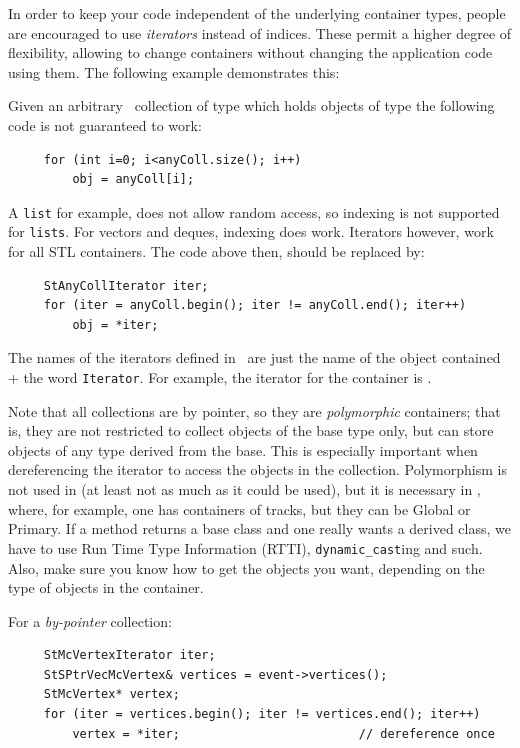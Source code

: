 In order to keep your code independent of the underlying container
types, people are encouraged to use \textit{iterators} instead of
indices. These permit a higher degree of flexibility,
allowing to change containers
without changing the application code using them. The following
example demonstrates this:

Given an arbitrary \StMcEvent\ collection  of type
which holds objects of type  the following code is
not guaranteed to work:
\begin{verbatim}
     for (int i=0; i<anyColl.size(); i++)
         obj = anyColl[i];
\end{verbatim}
A {\tt list} for example, does not allow random access, so indexing
is not supported for {\tt lists}.  For vectors and deques, indexing does work.
Iterators however, work for all STL containers.  The code above then,
should be replaced by:
\begin{verbatim}
     StAnyCollIterator iter;
     for (iter = anyColl.begin(); iter != anyColl.end(); iter++)
         obj = *iter;
\end{verbatim}

The names of the iterators defined in \StMcEvent\ are just the name
of the object contained + the word {\tt Iterator}.  For example,
the iterator for the container  is
.

Note that all collections are by pointer, so they are
\textit{polymorphic} containers; that is, they are not restricted to
collect objects of the base type only, but can store
objects of any type derived from
the base. This is especially important when dereferencing the iterator to
access the objects in the collection.  Polymorphism is
not used in \StMcEvent (at least not as much as it could be used), but
it is necessary in \StEvent, where,
for example, one has containers of tracks, but they can be Global
or Primary.  If a method returns a base class and one really wants
a derived class, we have to use Run Time Type Information (RTTI),
{\tt dynamic\_cast}ing and such.  Also, make sure you know how to
get the objects you want, depending on the type of objects in the
container.

For a \textit{by-pointer} collection:
\begin{verbatim}
     StMcVertexIterator iter;
     StSPtrVecMcVertex& vertices = event->vertices();
     StMcVertex* vertex;
     for (iter = vertices.begin(); iter != vertices.end(); iter++)
         vertex = *iter;                         // dereference once
\end{verbatim}

